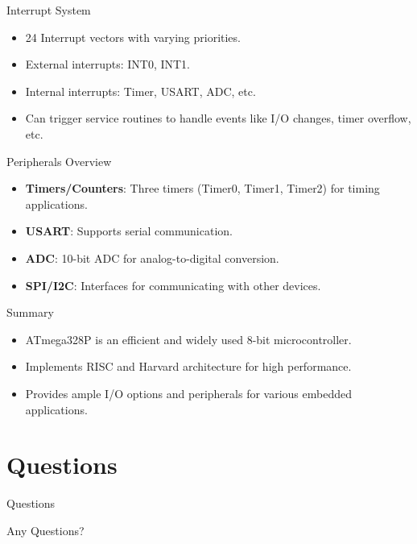 \documentclass[aspectratio=169]{beamer}
\begin{document}
\begin{frame}{Interrupt System}
    \begin{itemize}
        \item 24 Interrupt vectors with varying priorities.
        \item External interrupts: INT0, INT1.
        \item Internal interrupts: Timer, USART, ADC, etc.
        \item Can trigger service routines to handle events like I/O changes, timer overflow, etc.
    \end{itemize}
\end{frame}

\begin{frame}{Peripherals Overview}
    \begin{itemize}
        \item \textbf{Timers/Counters}: Three timers (Timer0, Timer1, Timer2) for timing applications.
        \item \textbf{USART}: Supports serial communication.
        \item \textbf{ADC}: 10-bit ADC for analog-to-digital conversion.
        \item \textbf{SPI/I2C}: Interfaces for communicating with other devices.
    \end{itemize}
\end{frame}

\begin{frame}{Summary}
    \begin{itemize}
        \item ATmega328P is an efficient and widely used 8-bit microcontroller.
        \item Implements RISC and Harvard architecture for high performance.
        \item Provides ample I/O options and peripherals for various embedded applications.
    \end{itemize}
\end{frame}

\section{Questions}
\begin{frame}{Questions}
    \begin{center}
        \Huge{Any Questions?}
    \end{center}
\end{frame}
\end{document}

